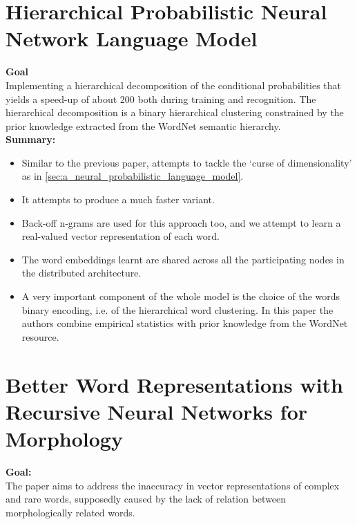 \documentclass[11pt,a4paper]{article}
\begin{document}


\section{Hierarchical Probabilistic Neural Network Language Model} %
\label{sec:hierarchical_probabilistic_neural_network_language_model}

  \textbf{Goal}\\
  Implementing a  hierarchical decomposition of the conditional probabilities that yields a speed-up of about 200 both during training and recognition. The hierarchical decomposition is a binary hierarchical clustering constrained by the prior knowledge extracted from the WordNet semantic hierarchy.\\

  \textbf{Summary:}
  \begin{itemize}
    \item 
    Similar to the previous paper, attempts to tackle the `curse of dimensionality' as in \ref{sec:a_neural_probabilistic_language_model}. 
    \item 
    It attempts to produce a much faster variant.
    \item 
    Back-off n-grams are used for this approach too, and we attempt to learn a real-valued vector representation of each word.
    \item 
    The word embeddings learnt are shared across all the participating nodes in the distributed architecture.
    \item 
    A very important component of the whole model is the choice of the words binary encoding, i.e. of the hierarchical word clustering. In this paper the authors combine empirical statistics with prior knowledge from the WordNet resource.
  \end{itemize}



\section{Better Word Representations with Recursive Neural Networks for Morphology} %
\label{sec:better_word_representations_with_recursive_neural_networks_for_morphology}

  \textbf{Goal:}\\
  The paper aims to address the inaccuracy in vector representations of complex and rare words, supposedly caused by the lack of relation between morphologically related words. \cite{luong2013better}\\
\end{document}
